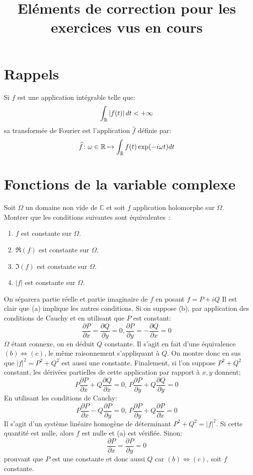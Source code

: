 \documentclass[a4paper, 12pt]{amsart}
\title{Eléments de correction pour les exercices vus en cours}
\newcommand{\pd}[2]{\ensuremath{\frac{\partial #1}{\partial #2}}}
\begin{document}
\maketitle
\section{Rappels}
Si $f$ est une application intégrable telle que:
\[
\int_{\mathbb{R}} \left | f(t) \right| dt < +\infty
\]
sa transformée de Fourier est l'application $\widehat{f}$ définie par:
\[
\widehat{f} \colon \omega \in \mathbb{R} \mapsto \int_{\mathbb{R}} f(t) \exp(-i \omega t ) dt
\]
\section{Fonctions de la variable complexe}
\begin{fex}
 Soit $\Omega$ un domaine non vide de $\mathbb{C}$ et soit $f$ application
holomorphe sur $\Omega$. Montrer que les conditions suivantes sont
équivalentes~:
\renewcommand{\theenumi}{\alph{enumi}}
\begin{enumerate}
\item $f$ est constante sur $\Omega$.
\item $\Re(f)$ est constante sur $\Omega$.
\item $\Im(f)$ est constante sur $\Omega$.
\item $|f|$ est constante sur $\Omega$.
\end{enumerate}
\end{fex}
On séparera partie réelle et partie imaginaire de $f$ en posant $f=P+iQ$
Il est clair que (a) implique les autres conditions. Si on suppose (b), par
application des conditions de Cauchy et en utilisant que $P$ est constant:
\[
 \pd{P}{x} = \pd{Q}{y} = 0 , \pd{P}{y}=-\pd{Q}{x} = 0
\]
$\Omega$ étant connexe, on en déduit $Q$ constante. Il s'agit en fait d'une
équivalence $(b) \Leftrightarrow (c)$, le même raisonnement s'appliquant à $Q$.
On montre donc en sus que $|f|^2=P^2+Q^2$ est aussi une constante.
Finalement, si l'on suppose $P^2+Q^2$ constant, les dérivées partielles de
cette application par rapport à $x,y$ donnent;
\[
 P\pd{P}{x}+Q\pd{Q}{x}= 0,\,  P\pd{P}{y}+Q\pd{Q}{y}= 0
\]
En utilisant les conditions de Cauchy:
\[
 P\pd{P}{x}-Q\pd{P}{y}= 0,\,  P\pd{P}{y}+Q\pd{P}{x}= 0
\]
Il s'agit d'un système linéaire homogène de déterminant $P^2+Q^2=|f|^2$. Si
cette quantité est nulle, alors $f$ est nulle et (a) est vérifiée. Sinon:
\[
 \pd{P}{x}=\pd{P}{y}=0
\]
prouvant que $P$ est une constante et donc aussi $Q$ car $(b) \Leftrightarrow
(c)$, soit $f$ constante.
\end{document}
